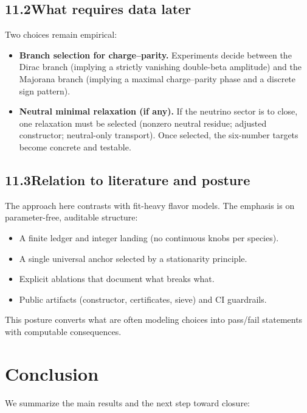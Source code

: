 \documentclass[11pt]{article}
\begin{document}
\subsection*{11.2\quad What requires data later}

Two choices remain empirical:
\begin{itemize}
  \item \textbf{Branch selection for charge--parity.} Experiments decide between the Dirac branch (implying a strictly vanishing double-beta amplitude) and the Majorana branch (implying a maximal charge--parity phase and a discrete sign pattern).
  \item \textbf{Neutral minimal relaxation (if any).} If the neutrino sector is to close, one relaxation must be selected (nonzero neutral residue; adjusted constructor; neutral-only transport). Once selected, the six-number targets become concrete and testable.
\end{itemize}

\subsection*{11.3\quad Relation to literature and posture}

The approach here contrasts with fit-heavy flavor models. The emphasis is on parameter-free, auditable structure:
\begin{itemize}
  \item A finite ledger and integer landing (no continuous knobs per species).
  \item A single universal anchor selected by a stationarity principle.
  \item Explicit ablations that document what breaks what.
  \item Public artifacts (constructor, certificates, sieve) and CI guardrails.
\end{itemize}
This posture converts what are often modeling choices into pass/fail statements with computable consequences.

\section{Conclusion}

We summarize the main results and the next step toward closure:
\end{document}
